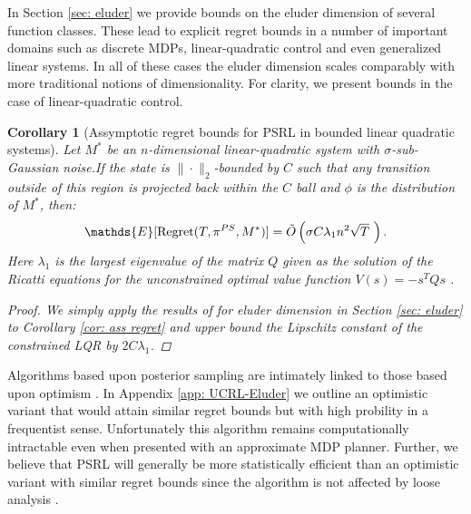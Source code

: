 \documentclass{article}
\newtheorem{corollary}{Corollary}
\newcommand{\Exp}{\mathds{E}}
\begin{document}
In Section \ref{sec: eluder} we provide bounds on the eluder dimension of several function classes.
These lead to explicit regret bounds in a number of important domains such as discrete MDPs, linear-quadratic control and even generalized linear systems.
In all of these cases the eluder dimension scales comparably with more traditional notions of dimensionality.
For clarity, we present bounds in the case of linear-quadratic control.

\begin{corollary}[Assymptotic regret bounds for PSRL in bounded linear quadratic systems]
\label{cor: LQR} \hspace{0.00000000000001mm} \newline
Let $M^*$ be an $n$-dimensional linear-quadratic system with $\sigma$-sub-Gaussian noise.If the state is $\| \cdot \|_2$-bounded by $C$ such that any transition outside of this region is projected back within the $C$ ball and $\phi$ is the distribution of $M^*$, then:
\begin{equation}
	\Exp[{\rm Regret}(T,\pi^{PS},M^*)] = \tilde{O} \left( \sigma C \lambda_1 n^2 \sqrt{T} \ \right).
\end{equation}
Here $\lambda_1$ is the largest eigenvalue of the matrix $Q$ given as the solution of the Ricatti equations for the unconstrained optimal value function $V(s) = -s^T Q s$ \cite{bertsekas1995dynamic}.
\begin{proof}
We simply apply the results of for eluder dimension in Section \ref{sec: eluder} to Corollary \ref{cor: ass regret} and upper bound the Lipschitz constant of the constrained LQR by $2 C \lambda_1$.
\end{proof}
\end{corollary}

Algorithms based upon posterior sampling are intimately linked to those based upon optimism \cite{russo2013}.
In Appendix \ref{app: UCRL-Eluder} we outline an optimistic variant that would attain similar regret bounds but with high probility in a frequentist sense.
Unfortunately this algorithm remains computationally intractable even when presented with an approximate MDP planner.
Further, we believe that PSRL will generally be more statistically efficient than an optimistic variant with similar regret bounds since the algorithm is not affected by loose analysis \cite{osband2013more}.


\end{document}
